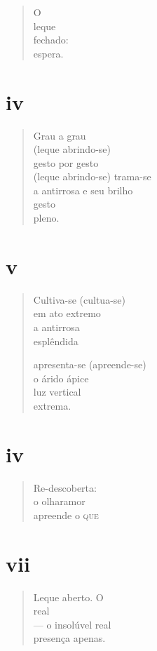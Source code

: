 \begin{verse}
O\\
leque\\
fechado:\\
espera.
\end{verse}

\medskip
\section{iv}

\begin{verse}
Grau a grau\\
(leque abrindo-se)\\
gesto por gesto\\
(leque abrindo-se) trama-se\\
a antirrosa e seu brilho\\
\quad\quad\quad{}gesto\\
\quad\quad\quad{}pleno.
\end{verse}

\medskip
\section{v}

\begin{verse}
Cultiva-se (cultua-se)\\
em ato extremo\\
a antirrosa\\
esplêndida

apresenta-se (apreende-se)\\
o árido ápice\\
luz vertical\\
extrema.
\end{verse}

\medskip
\section{iv}

\begin{verse}
Re-descoberta:\\
o olharamor\\
apreende o
\hfill\textsc{que}
\end{verse}

\medskip
\section{vii}

\begin{verse}
Leque aberto. O\\
real\\
---  o insolúvel real\\
\quad{}presença apenas.
\end{verse}


